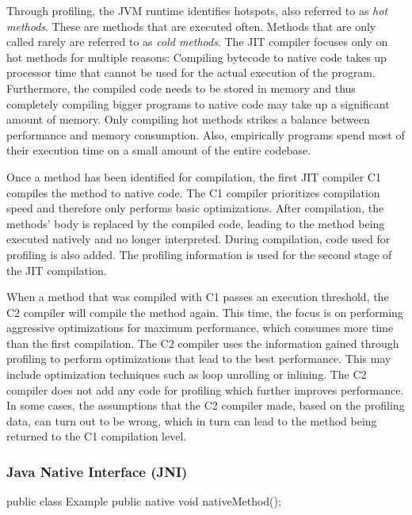 
Through profiling, the JVM runtime identifies hotspots, also referred to as \textit{hot methods}. These are methods that are executed often. Methods that are only called rarely are referred to as \textit{cold methods}. The JIT compiler focuses only on hot methods for multiple reasons: Compiling bytecode to native code takes up processor time that cannot be used for the actual execution of the program. Furthermore, the compiled code needs to be stored in memory and thus completely compiling bigger programs to native code may take up a significant amount of memory. Only compiling hot methods strikes a balance between performance and memory consumption. Also, empirically programs spend most of their execution time on a small amount of the entire codebase. 

Once a method has been identified for compilation, the first JIT compiler C1 compiles the method to native code. The C1 compiler prioritizes compilation speed and therefore only performs basic optimizations. After compilation, the methods' body is replaced by the compiled code, leading to the method being executed natively and no longer interpreted. During compilation, code used for profiling is also added. The profiling information is used for the second stage of the JIT compilation. 

When a method that was compiled with C1 passes an execution threshold, the C2 compiler will compile the method again. This time, the focus is on performing aggressive optimizations for maximum performance, which consumes more time than the first compilation. The C2 compiler uses the information gained through profiling to perform optimizations that lead to the best performance. This may include optimization techniques such as loop unrolling or inlining. The C2 compiler does not add any code for profiling which further improves performance. In some cases, the assumptions that the C2 compiler made, based on the profiling data, can turn out to be wrong, which in turn can lead to the method being returned to the C1 compilation level.

\subsubsection{Java Native Interface (JNI)}


\begin{JavaCode}[float,numbers=none,caption=Declaration of a native method in Java., label=lst:JNINativeMethod]
    public class Example {
        public native void nativeMethod();
    }
\end{JavaCode}


